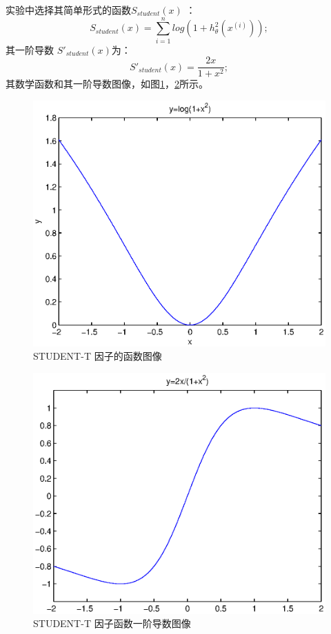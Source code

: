 \documentclass[oneside]{ZJUthesis}
\begin{document}
实验中选择其简单形式的函数$S_{student}(x)$ ：
\begin{equation}
S_{student}(x)=\sum\limits_{i=1}^{n}{log(1+h_{\theta}^2(x^{(i)}))};
\end{equation}
其一阶导数 $S'_{student}(x)$为：
\begin{equation}
S'_{student}(x)=\frac{2x}{1+x^2};
\end{equation}
其数学函数和其一阶导数图像，如图\ref{fig:t}，\ref{fig:dt}所示。
\begin{figure}[H]
\centering
\includegraphics[scale=0.5]{./Pictures/t.eps}
\caption{STUDENT-T 因子的函数图像}
\label{fig:t}
\end{figure}

\begin{figure}[H]
\centering
\includegraphics[scale=0.5]{./Pictures/pt.eps}
\caption{STUDENT-T 因子函数一阶导数图像}
\label{fig:dt}
\end{figure}
\end{document}
